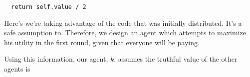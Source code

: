 \documentclass[11pt]{article}
\begin{document}
\begin{enumerate}[resume]
\begin{enumerate}
  \begin{lstlisting}
  return self.value / 2
  \end{lstlisting}
  Here's we're taking advantage of the code that was initially distributed. It's a safe assumption to.
  Therefore, we design an agent which attempts to maximize his utility in the first round, given that everyone will be paying.

  Using this information, our agent, $k$, assumes the truthful value of the other agents is
  
  \end{enumerate}
\end{enumerate}
\end{document}

